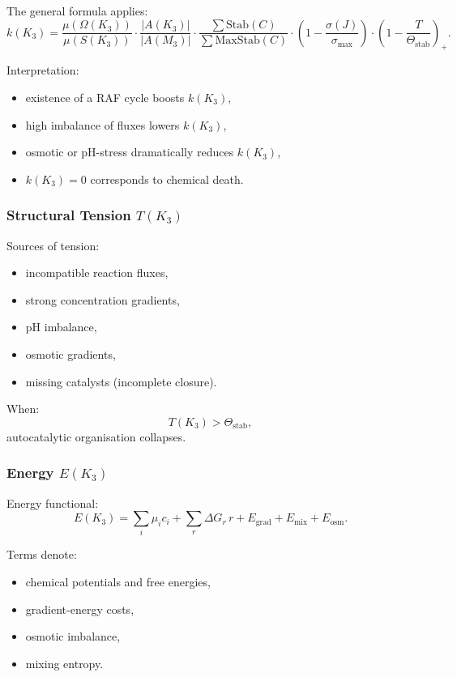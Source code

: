 The general formula applies:
\[
k(K_3) =
\frac{\mu(\Omega(K_3))}{\mu(S(K_3))}
\cdot
\frac{|A(K_3)|}{|A(M_3)|}
\cdot
\frac{\sum \mathrm{Stab}(C)}{\sum \mathrm{MaxStab}(C)}
\cdot
(1 - \frac{\sigma(J)}{\sigma_{\max}})
\cdot
(1 - \frac{T}{\Theta_{\mathrm{stab}}})_+.
\]

Interpretation:
\begin{itemize}
    \item existence of a RAF cycle boosts $k(K_3)$,
    \item high imbalance of fluxes lowers $k(K_3)$,
    \item osmotic or pH-stress dramatically reduces $k(K_3)$,
    \item $k(K_3)=0$ corresponds to chemical death.
\end{itemize}

\subsubsection{Structural Tension \texorpdfstring{$T(K_3)$}{T(K_3)}}

Sources of tension:
\begin{itemize}
    \item incompatible reaction fluxes,
    \item strong concentration gradients,
    \item pH imbalance,
    \item osmotic gradients,
    \item missing catalysts (incomplete closure).
\end{itemize}

When:
\[
T(K_3) > \Theta_{\mathrm{stab}},
\]
autocatalytic organisation collapses.

\subsubsection{Energy \texorpdfstring{$E(K_3)$}{E(K_3)}}

Energy functional:
\[
E(K_3) =
\sum_i \mu_i c_i +
\sum_r \Delta G_r\, r +
E_{\mathrm{grad}} + E_{\mathrm{mix}} + E_{\mathrm{osm}}.
\]

Terms denote:
\begin{itemize}
    \item chemical potentials and free energies,
    \item gradient-energy costs,
    \item osmotic imbalance,
    \item mixing entropy.
\end{itemize}

